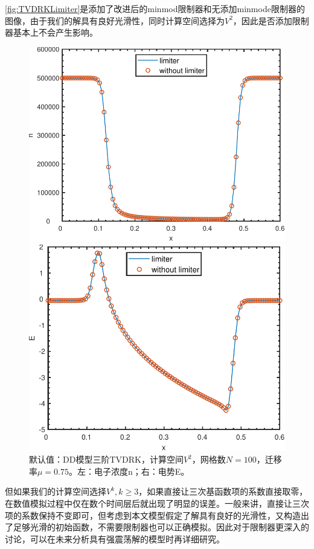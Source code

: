 \autoref{fig:TVDRKLimiter}是添加了改进后的minmod限制器和无添加minmode限制器的图像，由于我们的解具有良好光滑性，同时计算空间选择为$V^2$，因此是否添加限制器基本上不会产生影响。
\begin{figure}
    \centering
    \begin{minipage}{0.45\linewidth}
        \centering
        \includegraphics[width=\linewidth]{figure/DDTVDRK3Degree2N100mu0.75limitern.pdf}
    \end{minipage}
    \hspace{1cm}
    \begin{minipage}{0.45\linewidth}
        \centering
        \includegraphics[width=\linewidth]{figure/DDTVDRK3Degree2N100mu0.75limiterE.pdf}
    \end{minipage}
    \caption{默认值：DD模型三阶TVDRK，计算空间$V^2$，网格数$N=100$，迁移率$\mu=0.75$。左：电子浓度n；右：电势E。}
    \label{fig:TVDRKLimiter}
\end{figure}
但如果我们的计算空间选择$V^k , k\geq 3$，如果直接让三次基函数项的系数直接取零，在数值模拟过程中仅在数个时间层后就出现了明显的误差。一般来讲，直接让三次项的系数保持不变即可，但考虑到本文模型假定了解具有良好的光滑性，又构造出了足够光滑的初始函数，不需要限制器也可以正确模拟。因此对于限制器更深入的讨论，可以在未来分析具有强震荡解的模型时再详细研究。

